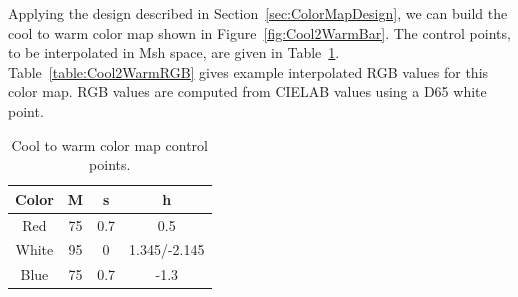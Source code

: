 \documentclass{acmsiggraph}               %
\newcommand{\RGB}{RGB\xspace}
\newcommand{\Lab}{CIELAB\xspace}
\newcommand{\Msh}{Msh\xspace}
\begin{document}
Applying the design described in Section~\ref{sec:ColorMapDesign}, we can
build the cool to warm color map shown in Figure~\ref{fig:Cool2WarmBar}.
The control points, to be interpolated in \Msh space, are given in
Table~\ref{table:Cool2Warm}.  Table~\ref{table:Cool2WarmRGB} gives example
interpolated \RGB values for this color map.  \RGB values are computed from
\Lab values using a D65 white point.

\begin{table}
  \centering
  \caption{Cool to warm color map control points.}
  \begin{tabular}{c@{\qquad}ccc}
    Color & M & s & h \\
    \hline
    Red & 75 & 0.7 & 0.5 \\
    White & 95 & 0 & 1.345/-2.145 \\
    Blue & 75 & 0.7 & -1.3
  \end{tabular}
  \label{table:Cool2Warm}
\end{table}
\end{document}
